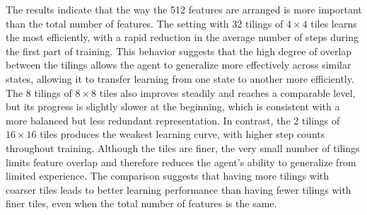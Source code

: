\documentclass[11pt]{article}
\begin{document}
The results indicate that the way the 512 features are arranged is more important than the total number of features. The setting with 32 tilings of $4 \times 4$ tiles learns the most efficiently, with a rapid reduction in the average number of steps during the first part of training. This behavior suggests that the high degree of overlap between the tilings allows the agent to generalize more effectively across similar states, allowing it to transfer learning from one state to another more efficiently. The 8 tilings of $8 \times 8$ tiles also improves steadily and reaches a comparable level, but its progress is slightly slower at the beginning, which is consistent with a more balanced but less redundant representation. In contrast, the 2 tilings of $16 \times 16$ tiles produces the weakest learning curve, with higher step counts throughout training. Although the tiles are finer, the very small number of tilings limits feature overlap and therefore reduces the agent's ability to generalize from limited experience. The comparison suggests that having more tilings with coarser tiles leads to better learning performance than having fewer tilings with finer tiles, even when the total number of features is the same.
\end{document}
